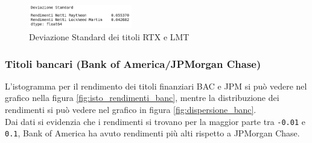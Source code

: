 \documentclass{article}
\begin{document}
\begin{figure}[h]
  \centering
  \includegraphics[width=0.4\textwidth]{ds_mil.png}
  \caption{Deviazione Standard dei titoli RTX e LMT}
  \label{fig:ds_mil}
\end{figure}

\pagebreak

\subsubsection{Titoli bancari (Bank of America/JPMorgan Chase)}

L'istogramma per il rendimento dei titoli finanziari BAC e JPM si può vedere nel grafico nella figura \ref{fig:isto_rendimenti_banc}, mentre la distribuzione dei rendimenti
si può vedere nel grafico in figura \ref{fig:dispersione_banc}.\\
Dai dati si evidenzia che i rendimenti si trovano per la maggior parte tra \verb|-0.01| e \verb|0.1|, Bank of America ha avuto rendimenti più alti
rispetto a JPMorgan Chase.
\end{document}
